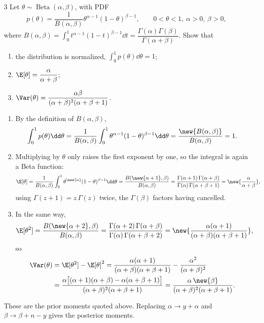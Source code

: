 \begin{homework}{3}
Let $\theta \sim \operatorname{Beta}(\alpha, \beta)$, with PDF
\[
p(\theta) = \frac{1}{B(\alpha,\beta)}\theta^{\alpha-1}(1-\theta)^{\beta-1}, \qquad 0 < \theta < 1,\ \alpha > 0,\ \beta > 0,
\]
where $B(\alpha,\beta) = \int_0^1 t^{\alpha-1}(1-t)^{\beta-1}\dd t = \dfrac{\Gamma(\alpha)\Gamma(\beta)}{\Gamma(\alpha+\beta)}$. Show that
\begin{enumerate}[label=(\roman*)]
\item the distribution is normalized, $\int_0^1 p(\theta)\dd\theta = 1$;
\item $\E[\theta] = \dfrac{\alpha}{\alpha+\beta}$;
\item $\Var(\theta) = \dfrac{\alpha\beta}{(\alpha+\beta)^2(\alpha+\beta+1)}$.
\end{enumerate}

\soln
\begin{enumerate}[label=(\roman*)]
\item By the definition of $B(\alpha,\beta)$,
\[
\int_0^1 p(\theta)\dd\theta = \frac{1}{B(\alpha,\beta)}\int_0^1 \theta^{\alpha-1}(1-\theta)^{\beta-1}\dd\theta = \frac{\new{B(\alpha,\beta)}}{B(\alpha,\beta)} = 1.
\]
\item Multiplying by $\theta$ only raises the first exponent by one, so the integral is again a Beta function:
\[
\E[\theta] = \frac{1}{B(\alpha,\beta)}\int_0^1 \theta^{\new{\alpha}}(1-\theta)^{\beta-1}\dd\theta = \frac{B(\new{\alpha+1},\beta)}{B(\alpha,\beta)}
= \frac{\Gamma(\alpha+1)\,\Gamma(\alpha+\beta)}{\Gamma(\alpha)\,\Gamma(\alpha+\beta+1)} = \new{\frac{\alpha}{\alpha+\beta}},
\]
using $\Gamma(z+1) = z\,\Gamma(z)$ twice, the $\Gamma(\beta)$ factors having cancelled.
\item In the same way,
\[
\E[\theta^2] = \frac{B(\new{\alpha+2},\beta)}{B(\alpha,\beta)} = \frac{\Gamma(\alpha+2)\,\Gamma(\alpha+\beta)}{\Gamma(\alpha)\,\Gamma(\alpha+\beta+2)} = \new{\frac{\alpha(\alpha+1)}{(\alpha+\beta)(\alpha+\beta+1)}},
\]
so
\begin{align*}
\Var(\theta) &= \E[\theta^2] - \E[\theta]^2 = \frac{\alpha(\alpha+1)}{(\alpha+\beta)(\alpha+\beta+1)} - \frac{\alpha^2}{(\alpha+\beta)^2}\\
&= \frac{\alpha\big[(\alpha+1)(\alpha+\beta) - \alpha(\alpha+\beta+1)\big]}{(\alpha+\beta)^2(\alpha+\beta+1)}
= \frac{\alpha\,\new{\beta}}{(\alpha+\beta)^2(\alpha+\beta+1)}.
\end{align*}
\end{enumerate}
These are the prior moments quoted above. Replacing $\alpha \to y + \alpha$ and $\beta \to \beta + n - y$ gives the posterior moments.
\end{homework}

